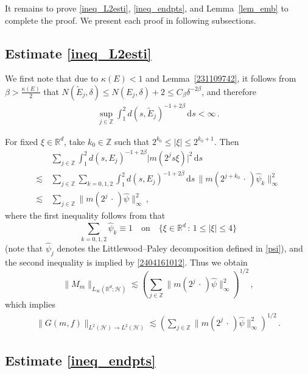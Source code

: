 \documentclass[11pt]{amsart}
\theoremstyle{plain}
\theoremstyle{definition}
\theoremstyle{remark}
\numberwithin{equation}{section}
\newcommand{\cH}{\mathcal{H}}
\newcommand{\bR}{\mathbb{R}}
\newcommand{\bZ}{\mathbb{Z}}
\newcommand{\dd}{\,\mathrm{d}}
\begin{document}
It remains to prove \eqref{ineq_L2esti}, \eqref{ineq_endpts}, and Lemma~\ref{lem_emb} to complete the proof.
We present each proof in following subsections.

\subsection{Estimate \eqref{ineq_L2esti}}
We first note that due to $\kappa(E)<1$ and Lemma~\ref{231109742}, it follows from $\beta>\frac{\kappa(E)}{2}$ that $N(\widetilde{E}_j,\delta)\leq N(E_j,\delta)+2\leq C_\beta \delta^{-2\beta}$, and therefore
\begin{align}\label{2404161012}
\sup_{j\in\bZ}\int_1^2d(s,\widetilde{E}_j)^{-1+2\beta}\dd s<\infty\,.
\end{align}

For fixed $\xi\in\bR^d$, take $k_0\in\bZ$ such that $2^{k_0}\leq |\xi|\leq 2^{k_0+1}$.
Then 
\begin{align*}
&\sum_{j\in\bZ}\int_1^2d(s,E_j)^{-1+2\beta}\big|m(2^js\xi)\big|^2\dd s\\
\lesssim\,&\sum_{j\in\bZ}\sum_{k=0,1,2}\int_1^2d(s,E_j)^{-1+2\beta}\dd s\, \|m(2^{j+k_0}\,\cdot\,)\widehat{\psi}_k\|_\infty^2\\
\lesssim\,& \sum_{j\in\bZ}\|m(2^j\,\cdot\,)\widehat{\psi}\|_\infty^2\,,
\end{align*}
where the first inequality follows from that
$$
\sum_{k=0,1,2}\widehat{\psi}_k\equiv 1\quad \text{on}\quad \{\xi\in\bR^d\,:\,1\leq |\xi|\leq 4\}
$$
(note that $\widehat{\psi}_j$ denotes the Littlewood--Paley decomposition defined in \eqref{psi}),
and the second inequality is implied by \eqref{2404161012}.
Thus we obtain
$$
\|M_m\|_{L_{\infty}(\bR^d;\cH)}\lesssim \left(\sum_{j\in\bZ}\|m(2^j\,\cdot\,)\widehat{\psi}\|_\infty^2\right)^{1/2}\,,
$$
which implies
\begin{align*}
    \|G(m,f)\|_{L^2(\mathcal{H})\to L^2(\mathcal{H})}
    \lesssim \left(\sum_{j\in\bZ}\|m(2^j\,\cdot\,)\widehat{\psi}\|_\infty^2\right)^{1/2}\,.
\end{align*}



\subsection{Estimate \eqref{ineq_endpts}}
\end{document}
